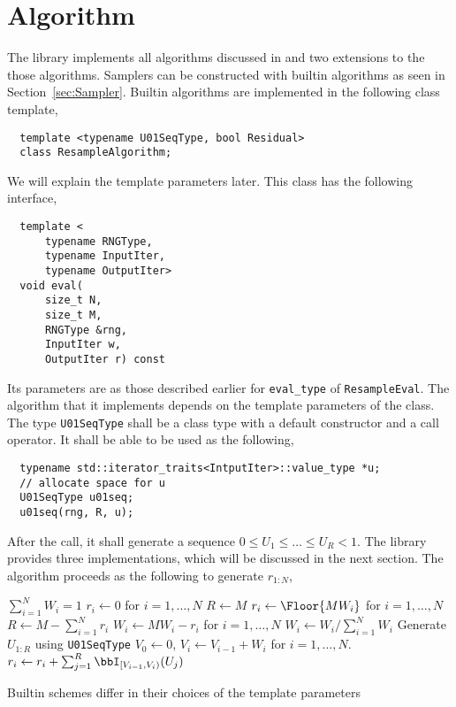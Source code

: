 \section{Algorithm}
\label{sec:Algorithm}

The library implements all algorithms discussed in \cite{Douc:2005wa} and two
extensions to the those algorithms. Samplers can be constructed with builtin
algorithms as seen in Section~\ref{sec:Sampler}. Builtin algorithms are
implemented in the following class template,
\begin{Verbatim}
  template <typename U01SeqType, bool Residual>
  class ResampleAlgorithm;
\end{Verbatim}
We will explain the template parameters later. This class has the following
interface,
\begin{Verbatim}
  template <
      typename RNGType,
      typename InputIter,
      typename OutputIter>
  void eval(
      size_t N,
      size_t M,
      RNGType &rng,
      InputIter w,
      OutputIter r) const
\end{Verbatim}
Its parameters are as those described earlier for \verb|eval_type| of
\verb|ResampleEval|. The algorithm that it implements depends on the template
parameters of the class. The type \verb|U01SeqType| shall be a class type with
a default constructor and a call operator. It shall be able to be used as the
following,
\begin{Verbatim}
  typename std::iterator_traits<IntputIter>::value_type *u;
  // allocate space for u
  U01SeqType u01seq;
  u01seq(rng, R, u);
\end{Verbatim}
After the call, it shall generate a sequence $0 \le U_1 \le \dots\le U_R < 1$.
The library provides three implementations, which will be discussed in the next
section. The algorithm proceeds as the following to generate $r_{1:N}$,
\begin{algorithmic}
  \REQUIRE $\sum_{i=1}^N W_i = 1$
  \STATE $r_i \leftarrow 0$ for $i = 1,\dots,N$
  \STATE $R \leftarrow M$
  \ELSE
  \STATE $r_i \leftarrow \Floor{MW_i}$ for $i = 1,\dots,N$
  \STATE $R \leftarrow M - \sum_{i=1}^N r_i$
  \STATE $W_i \leftarrow MW_i - r_i$ for $i = 1,\dots,N$
  \STATE $W_i \leftarrow W_i / \sum_{i=1}^NW_i$
  \ENDIF
  \STATE Generate $U_{1:R}$ using \verb|U01SeqType|
  \STATE $V_0 \leftarrow 0$, $V_i \leftarrow V_{i - 1} + W_i$ for $i =
  1,\dots,N$.
  \STATE $r_i \leftarrow r_i + \sum_{j=1}^R\bbI_{[V_{i-1},V_i)}(U_j)$
\end{algorithmic}
Builtin schemes differ in their choices of the template parameters
